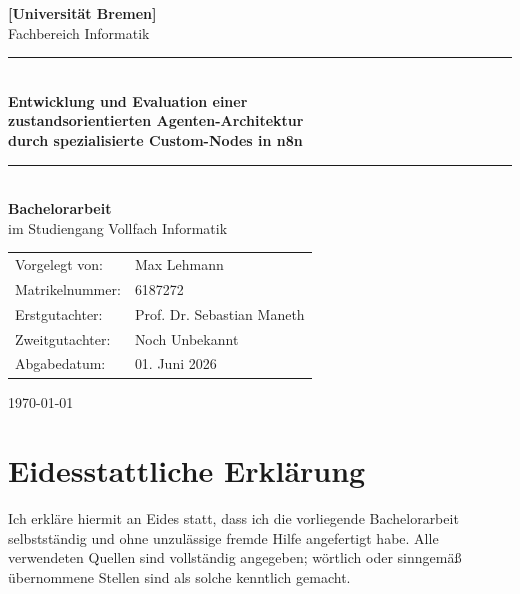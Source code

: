 \documentclass[12pt,a4paper,oneside]{report}
\begin{document}
\begin{titlepage}
  \centering
  \vspace*{1cm}

  {\Large \textbf{[Universität Bremen]}}\\[0.5cm]
  {\large Fachbereich Informatik}\\[2cm]

  \rule{\textwidth}{1.5pt}\\[0.4cm]
  {\huge \textbf{Entwicklung und Evaluation einer\\[0.3cm]
  zustandsorientierten Agenten-Architektur\\[0.3cm]
  durch spezialisierte Custom-Nodes in n8n}}\\[0.4cm]
  \rule{\textwidth}{1.5pt}\\[2cm]

  {\large \textbf{Bachelorarbeit}}\\[0.5cm]
  {\normalsize im Studiengang Vollfach Informatik}\\[2cm]

  \begin{tabular}{ll}
    Vorgelegt von:    & Max Lehmann\\
    Matrikelnummer:   & 6187272\\
    Erstgutachter:    & Prof. Dr. Sebastian Maneth\\
    Zweitgutachter:   & Noch Unbekannt\\
    Abgabedatum:      & 01. Juni 2026\\
  \end{tabular}

  \vfill
  {\small \today}
\end{titlepage}

\thispagestyle{empty}
\chapter*{Eidesstattliche Erklärung}

Ich erkläre hiermit an Eides statt, dass ich die vorliegende Bachelorarbeit
selbstständig und ohne unzulässige fremde Hilfe angefertigt habe. Alle verwendeten
Quellen sind vollständig angegeben; wörtlich oder sinngemäß übernommene Stellen sind
als solche kenntlich gemacht.
\end{document}
